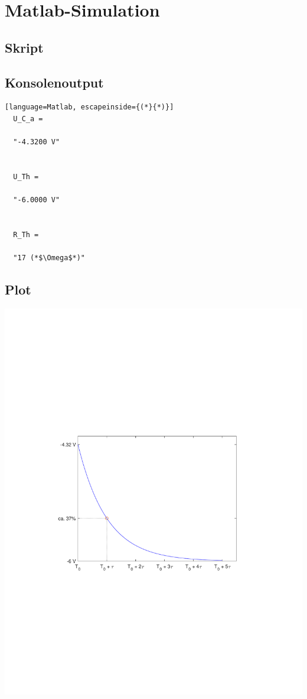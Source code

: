 \documentclass[11pt]{scrartcl}
\begin{document}
\newpage
\section{Matlab-Simulation}
\subsection{Skript}


\subsection{Konsolenoutput}
\begin{lstlisting}[language=Matlab, escapeinside={(*}{*)}]
  U_C_a =

  "-4.3200 V"


  U_Th =

  "-6.0000 V"


  R_Th =

  "17 (*$\Omega$*)"
\end{lstlisting}

\subsection{Plot}
\begin{center}
  \includegraphics[scale=1]{./Assets/u_C_plot.pdf}
  \label{fig:umschalt_2}
\end{center}
\end{document}
